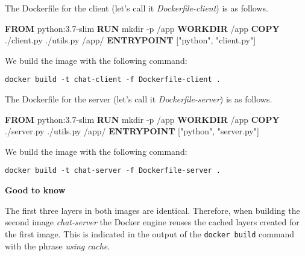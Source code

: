 \documentclass[
]{article}
\newenvironment{Shaded}{\begin{snugshade}}{\end{snugshade}}
\newcommand{\KeywordTok}[1]{\textcolor[rgb]{0.13,0.29,0.53}{\textbf{#1}}}
\newcommand{\NormalTok}[1]{#1}
\newcommand{\StringTok}[1]{\textcolor[rgb]{0.31,0.60,0.02}{#1}}
\newenvironment{infobox}[1]
  {
  \begin{itemize}
  \renewcommand{\labelitemi}{
    \raisebox{-.7\height}[0pt][0pt]{
      
    }
  }
  \setlength{\fboxsep}{1em}
  \begin{whitebox}
  \item
  }
  {
  \end{whitebox}
  \end{itemize}
  }
\theoremstyle{definition}
\theoremstyle{definition}
\theoremstyle{definition}
\theoremstyle{remark}
\begin{document}
\begin{infobox}{exercisebox}

The Dockerfile for the client (let's call it \emph{Dockerfile-client})
is as follows.

\begin{Shaded}
\begin{Highlighting}[]
\KeywordTok{FROM}\NormalTok{ python:3.7{-}slim}
\KeywordTok{RUN}\NormalTok{ mkdir {-}p /app}
\KeywordTok{WORKDIR}\NormalTok{ /app}
\KeywordTok{COPY}\NormalTok{ ./client.py ./utils.py /app/}
\KeywordTok{ENTRYPOINT}\NormalTok{ [}\StringTok{"python"}\NormalTok{, }\StringTok{"client.py"}\NormalTok{]}
\end{Highlighting}
\end{Shaded}

We build the image with the following command:

\begin{verbatim}
docker build -t chat-client -f Dockerfile-client .
\end{verbatim}

The Dockerfile for the server (let's call it \emph{Dockerfile-server})
is as follows.

\begin{Shaded}
\begin{Highlighting}[]
\KeywordTok{FROM}\NormalTok{ python:3.7{-}slim}
\KeywordTok{RUN}\NormalTok{ mkdir {-}p /app}
\KeywordTok{WORKDIR}\NormalTok{ /app}
\KeywordTok{COPY}\NormalTok{ ./server.py ./utils.py /app/}
\KeywordTok{ENTRYPOINT}\NormalTok{ [}\StringTok{"python"}\NormalTok{, }\StringTok{"server.py"}\NormalTok{]}
\end{Highlighting}
\end{Shaded}

We build the image with the following command:

\begin{verbatim}
docker build -t chat-server -f Dockerfile-server .
\end{verbatim}

\begin{infobox}{curiosity}

\textbf{Good to know}

The first three layers in both images are identical.
Therefore, when building the second image \emph{chat-server}
the Docker engine reuses the cached layers
created for the first image.
This is indicated in the output of the
\texttt{docker\ build} command with the phrase \emph{using cache}.

\end{infobox}

\end{infobox}
\end{document}
